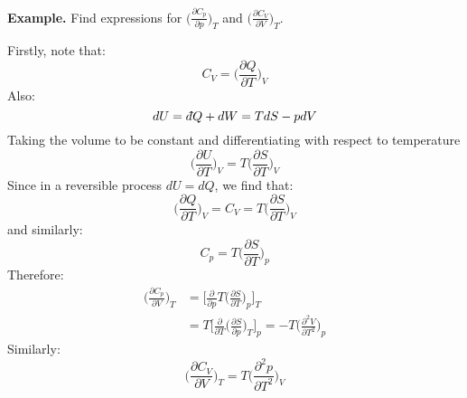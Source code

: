 \documentclass[a4paper,11pt,oneside]{book}
\newcommand{\dbar}{d\hspace*{-0.08em}\bar{}\hspace*{0.1em}}
\begin{document}
\begin{strategy}
\textbf{Example.} Find expressions for $\Big(\frac{\partial C_p}{\partial p}\Big)_T$ and $\Big(\frac{\partial C_V}{\partial V}\Big)_T$. 
\end{strategy}
\begin{mdframed}
\begin{solution}
Firstly, note that:
\begin{equation}
    C_V = \bigg(\frac{\partial Q}{\partial T}\bigg)_V
\end{equation}
Also:
\begin{equation}
    dU = \dbar Q + dW = TdS - pdV
\end{equation}
Taking the volume to be constant and differentiating with respect to temperature
\begin{equation}
   \bigg( \frac{\partial U}{\partial T}\bigg)_V = T \bigg(\frac{\partial S}{\partial T}\bigg)_V
\end{equation}
Since in a reversible process $dU = dQ$, we find that:
\begin{equation}
   \bigg( \frac{\partial Q}{\partial T}\bigg)_V = C_V =T \bigg(\frac{\partial S}{\partial T}\bigg)_V
\end{equation}
and similarly:
\begin{equation}
    C_p = T\bigg(\frac{\partial S}{\partial T}\bigg)_p
\end{equation}
Therefore:
\begin{align}
    \bigg(\frac{\partial C_p}{\partial V}\bigg)_T&=\Bigg[\frac{\partial}{\partial p} T  \bigg(\frac{\partial S}{\partial T}\bigg)_p\Bigg]_T\\
    &=T\Bigg[\frac{\partial}{\partial T}   \bigg(\frac{\partial S}{\partial p}\bigg)_T\Bigg]_p
    = -T \bigg(\frac{\partial^2 V}{\partial T^2}\bigg)_p
\end{align}
Similarly:
\begin{equation}
     \bigg(\frac{\partial C_V}{\partial V}\bigg)_T = T \bigg(\frac{\partial^2 p}{\partial T^2}\bigg)_V
\end{equation}
\end{solution}
\end{mdframed}
\end{document}
